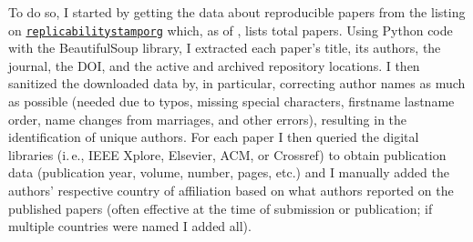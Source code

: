 \documentclass[conference]{vgtc}                     %
\newcommand{\ie}{i.\,e.}
\begin{document}
To do so, I started by getting the data about reproducible papers from the listing on \href{https://www.replicabilitystamp.org/}{\texttt{replicabilitystamporg}} which, as of \GrsiDataCurrentAsOf, lists \GrsiTotalPapers{} total papers. Using Python code with the BeautifulSoup library, I extracted each paper's title, its authors, the journal, the DOI, and the active and archived repository locations. I then sanitized the downloaded data by, in particular, correcting author names as much as possible (needed due to typos, missing special characters, firstname lastname order, name changes from marriages, and other errors), resulting in the identification of \GrsiTotalAuthors{} unique authors. For each paper I then queried the digital libraries (\ie, IEEE Xplore, Elsevier, ACM, or Crossref) to obtain publication data (publication year, volume, number, pages, etc.) and I manually added the authors' respective country of affiliation based on what authors reported on the published papers (often effective at the time of submission or publication; if multiple countries were named I added all).
\end{document}
